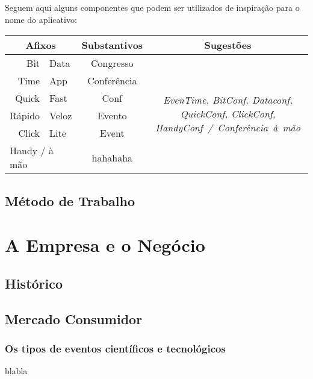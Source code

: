 \documentclass[a4paper]{abntex2}
\begin{document}
Seguem aqui alguns componentes que podem ser utilizados de inspiração para o nome do aplicativo:\\

\begin{tabular}{rl|c|c}
\multicolumn{2}{c|}{\textbf{Afixos}} & \textbf{Substantivos} & \textbf{Sugestões} \\\hline
Bit		& Data	& Congresso		& \multirow{6}{5cm}{\textit{EvenTime, BitConf, Dataconf, QuickConf, ClickConf, HandyConf~/~Conferência~à~mão}} \\\cline{1-3}
Time	& App	& Conferência	& \\\cline{1-3}
Quick	& Fast	& Conf			& \\\cline{1-3}
Rápido	& Veloz	& Evento		& \\\cline{1-3}
Click	& Lite	& Event			& \\\cline{1-3}
\multicolumn{2}{l|}{Handy / à mão}	& hahahaha		& \\
\end{tabular}


\section{Método de Trabalho}



\chapter{A Empresa e o Negócio}


\section{Histórico}

\section{Mercado Consumidor}

\subsection{Os tipos de eventos científicos e tecnológicos}
\label{sec:eventos}
blabla
\end{document}
